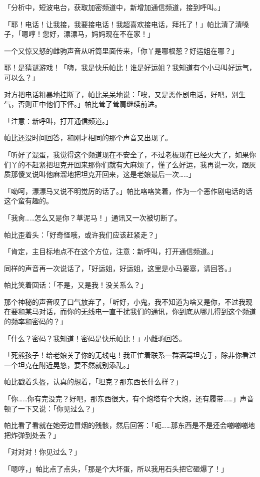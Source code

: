 「{\mt 分析中，短波电台，获取加密频道中，新增加通信频道，接到呼叫。}」

「耶！电话！让我接，我要接电话！我超喜欢接电话，拜托了！」帕比清了清嗓子，「嗯哼！您好，漂漂马，妈妈现在不在家！」

一个又惊又怒的雌驹声音从听筒里面传来，「你丫是哪根葱？好运姐在哪？」

耶！是猜谜游戏！「嗨，我是快乐帕比！谁是好运姐？我知道有个小马叫好运气，可以么？」

对方把电话粗暴地挂断了，帕比呆呆地说：「唉，又是恶作剧电话，好吧，别生气，否则正中他们下怀。」帕比耸了耸肩继续前进。

「{\mt 注意：新呼叫，打开通信频道。}」

帕比还没时间回答，和刚才相同的那个声音又出现了。

「听好了混蛋，我觉得这个频道现在不安全了，不过老板现在已经火大了，如果你们丫的不赶紧把坦克开回来那你们就有大麻烦了，懂了么好运，我再说一次，跟灰质那傻叉说叫他麻溜地把坦克开回来，这是老娘最后一次……」

「呦呵，漂漂马又说不明觉厉的话了。」帕比咯咯笑着，作为一个恶作剧电话的话这个蛮有趣的。

「我肏……怎么又是你？草泥马！」通讯又一次被切断了。

帕比歪着头：「好奇怪哦，或许我们应该赶紧走？」

「{\mt 肯定，主目标地点不在这个方位，注意：新呼叫，打开通信频道。}」

同样的声音再一次说话了，「好运姐，好运姐，这里是小马要塞，请回答。」

帕比笑着回话：「不是，又是我！没关系么？」

那个神秘的声音叹了口气放弃了，「听好，小鬼，我不知道为啥又是你，不过我现在要和某马对话，而你的无线电一直干扰我们的通讯，你到底从哪儿得到这个频道的频率和密码的？」

「什么？密码？我知道！密码是快乐帕比！」小雌驹回答。

「死熊孩子！给老娘关了你的无线电！我正忙着联系一群酒驾坦克手，除非你看过一个坦克在附近晃悠，要不然就别添乱。」

帕比戳着头盔，认真的想着，「坦克？那东西长什么样？」

「你……你有完没完？好吧，那东西很大，有个炮塔有个大炮，还有履带……」声音顿了一下又说：「你见过么？」

帕比看了看就在她旁边冒烟的残骸，然后回答：「呃……那东西是不是还会嘣嘣嘣地把炸弹到处丢？」

「对对对！你见过么？」

「嗯哼，」帕比点了点头，「那是个大坏蛋，所以我用石头把它砸爆了！」


